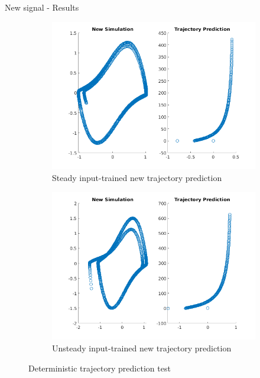 \documentclass{beamer}
\begin{document}
\begin{frame}{New signal - Results}
    \begin{figure}
        \centering
        \begin{subfigure}[b]{0.45\textwidth}
            \centering
            \includegraphics[width=\textwidth]{Steady_NewData.png}
            \caption{Steady input-trained new trajectory prediction}
            \label{fig:steady_new}
        \end{subfigure}
        \hfill
        \begin{subfigure}[b]{0.45\textwidth}
            \centering
            \includegraphics[width=\textwidth]{Unsteady_NewData.png}
            \caption{Unsteady input-trained new trajectory prediction}
            \label{fig:unsteady_new}
        \end{subfigure}
        \caption{Deterministic trajectory prediction test}
    \end{figure}
\end{frame}
\end{document}
